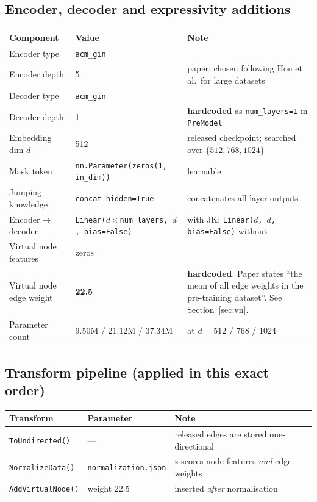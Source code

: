 \documentclass[10pt,a4paper]{article}
\newcommand{\hc}{\textcolor{haem}{\textbf{hardcoded}}}
\begin{document}
\subsection{Encoder, decoder and expressivity additions}

\begin{longtable}{@{}p{4.6cm}p{4.2cm}p{6.8cm}@{}}
\toprule
\textbf{Component} & \textbf{Value} & \textbf{Note} \\
\midrule \endhead
Encoder type & \texttt{acm\_gin} & \\
Encoder depth & 5 & paper: chosen following Hou et al.\ for large datasets \\
Decoder type & \texttt{acm\_gin} & \\
Decoder depth & 1 & \hc{} as \texttt{num\_layers=1} in \texttt{PreModel} \\
Embedding dim $d$ & 512 & released checkpoint; searched over $\{512, 768, 1024\}$ \\
Mask token & \texttt{nn.Parameter(zeros(1, in\_dim))} & learnable \\
Jumping knowledge & \texttt{concat\_hidden=True} & concatenates all layer outputs \\
Encoder$\rightarrow$decoder & \texttt{Linear($d \times$num\_layers, $d$, bias=False)} & with JK; \texttt{Linear($d$, $d$, bias=False)} without \\
Virtual node features & zeros & \\
Virtual node edge weight & \textbf{22.5} & \hc. Paper states ``the mean of all edge weights in the pre-training dataset''. See Section~\ref{sec:vn}. \\
Parameter count & 9.50M / 21.12M / 37.34M & at $d = 512$ / 768 / 1024 \\
\bottomrule
\end{longtable}

\subsection{Transform pipeline (applied in this exact order)}

\begin{longtable}{@{}p{4.6cm}p{4.2cm}p{6.8cm}@{}}
\toprule
\textbf{Transform} & \textbf{Parameter} & \textbf{Note} \\
\midrule \endhead
\texttt{ToUndirected()} & --- & released edges are stored one-directional \\
\texttt{NormalizeData()} & \texttt{normalization.json} & z-scores node features \emph{and} edge weights \\
\texttt{AddVirtualNode()} & weight 22.5 & inserted \emph{after} normalisation \\
\bottomrule
\end{longtable}
\end{document}
